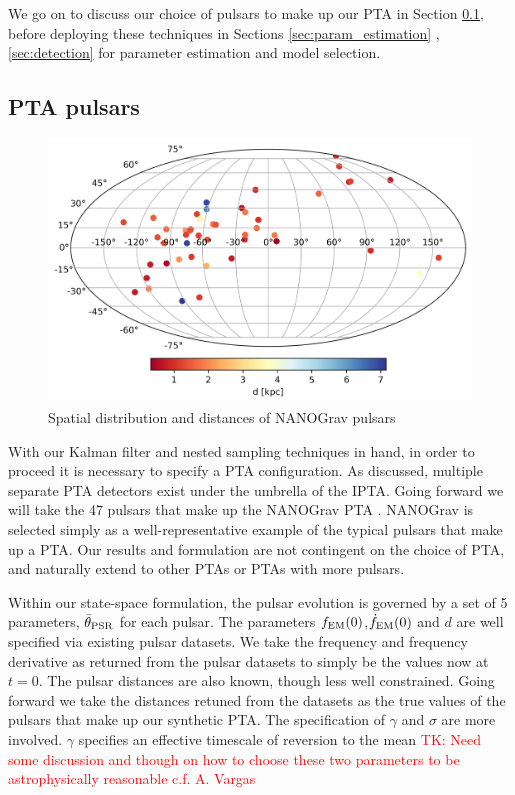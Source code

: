 \documentclass[fleqn,usenatbib,useAMS]{mnras}
\begin{document}
We go on to discuss our choice of pulsars to make up our PTA in Section \ref{sec:pta_pulsars}, before deploying these techniques in Sections \ref{sec:param_estimation} , \ref{sec:detection} for parameter estimation and model selection.



\subsection{PTA pulsars}\label{sec:pta_pulsars}
\begin{figure}
	\includegraphics[width=0.8\columnwidth]{images/pulsars}
	\caption{Spatial distribution and distances of NANOGrav pulsars}
	\label{fig:pulsar_distrib}
\end{figure}
\noindent With our Kalman filter and nested sampling techniques in hand, in order to proceed it is necessary to specify a PTA configuration. As discussed, multiple separate PTA detectors exist under the umbrella of the IPTA. Going forward we will take the 47 pulsars that make up the NANOGrav PTA \citep{2020ApJ...905L..34A}. NANOGrav is selected simply as a well-representative example of the typical pulsars that make up a PTA. Our results and formulation are not contingent on the choice of PTA, and naturally extend to other PTAs or PTAs with more pulsars.  \newline 



\noindent Within our state-space formulation, the pulsar evolution is governed by a set of 5 parameters, $\bar{\theta}_{\rm PSR}$ for each pulsar. The parameters $f_{\rm EM} (0) $,$ \dot{f}_{\rm EM} (0)$ and $d$ are well specified via existing pulsar datasets. We take the frequency and frequency derivative as returned from the pulsar datasets to simply be the values now at $t=0$. The pulsar distances are also known, though less well constrained. Going forward we take the distances retuned from the datasets as the true values of the pulsars that make up our synthetic PTA. The specification of $\gamma$ and $\sigma$ are more involved. $\gamma$ specifies an effective timescale of reversion to the mean \textcolor{red}{TK: Need some discussion and though on how to choose these two parameters to be astrophysically reasonable c.f. A. Vargas}
\end{document}
